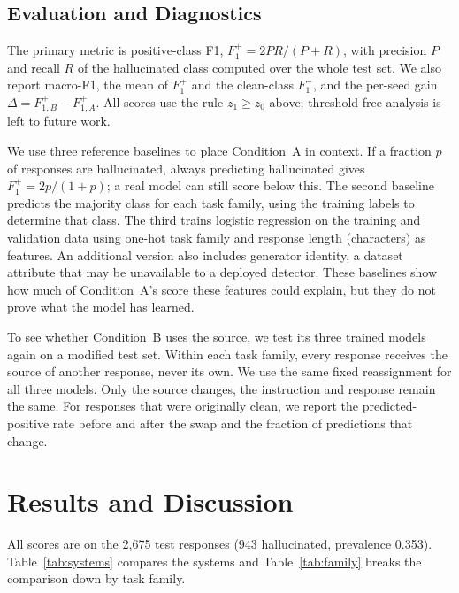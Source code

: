 \documentclass[conference]{IEEEtran}
\newcommand{\LenFeature}{characters}  %
\begin{document}
\subsection{Evaluation and Diagnostics}
The primary metric is positive-class F1, $F_1^{+}=2PR/(P+R)$, with precision
$P$ and recall $R$ of the hallucinated class computed over the whole test set.
We also report macro-F1, the mean of $F_1^{+}$ and the clean-class $F_1^{-}$,
and the per-seed gain $\Delta = F_{1,B}^{+}-F_{1,A}^{+}$. All scores use the
rule $z_1 \ge z_0$ above; threshold-free analysis is left to future work.

We use three reference baselines to place Condition~A in context. 
If a fraction $p$ of responses are hallucinated, always predicting
hallucinated gives $F_1^{+}=2p/(1+p)$; a real model can still score below this.
 The second baseline predicts the majority
class for each task family, using the training labels to determine that class.
The third trains logistic regression on the training and validation data using
one-hot task family and response length (\LenFeature{}) as features.
An additional version also includes generator identity, a dataset
attribute that may be unavailable to a deployed detector. These baselines show
how much of Condition~A's score these features could explain, but they do not
prove what the model has learned.

To see whether Condition~B uses the source, we test its three trained models
again on a modified test set. Within each task family, every response receives
the source of another response, never its own. We use the same fixed
reassignment for all three models. Only the source changes, the instruction and
response remain the same. For responses that were originally clean, we report
the predicted-positive rate before and after the swap and the fraction of
predictions that change.

\section{Results and Discussion}

All scores are on the 2{,}675 test responses (943 hallucinated, prevalence
0.353). Table~\ref{tab:systems} compares the systems and
Table~\ref{tab:family} breaks the comparison down by task family.
\end{document}
